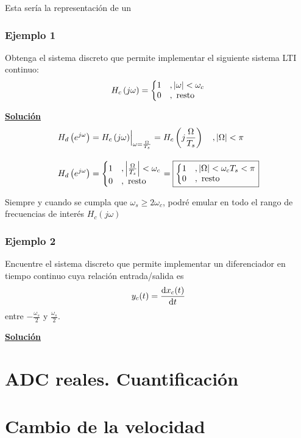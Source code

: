 \documentclass[a4paper]{book}
\begin{document}
Esta sería la representación de un

\subsubsection{Ejemplo 1}

Obtenga el sistema discreto que permite implementar el siguiente sistema LTI continuo:
\[ H_c \left( j\omega \right) = \left\lbrace
	\begin{matrix*}[l]
		1	&, \abs{\omega }<\omega _c\\
		0	&, \text{ resto}
	\end{matrix*} \right. \]

\textbf{\underline{Solución}}
\begin{align*}
	H_d \left( e^{j\omega} \right) & = \evaluat[\Big]{H_c \left( j\omega \right)}_{\omega = \frac{\Omega}{T_s}} = H_c \left( j \frac{\Omega}{T_s} \right) \quad , \abs{\Omega}<\pi \\[10pt]
	H_d \left( e^{j\omega} \right) & = \left\lbrace
	\begin{matrix*}[l]
		1 & , \abs{\frac{\Omega}{T_s} }<\omega _c\\
		0 & , \text{ resto}
	\end{matrix*} \right. = \boxed{\left\lbrace
	\begin{matrix*}[l]
		1 & , \abs{\Omega}<\omega _cT_s<\pi\\
		0 & , \text{ resto}
	\end{matrix*} \right.}
\end{align*}

Siempre y cuando se cumpla que $\omega_s\geq 2\omega_c$, podré emular en todo el rango de frecuencias de interés $H_c \left( j\omega \right)$

\subsubsection{Ejemplo 2}

Encuentre el sistema discreto que permite implementar un diferenciador en tiempo continuo cuya relación entrada/salida es
\[ y_c(t) = \dv{x_c(t)}{t} \]
entre $-\frac{\omega_s}{2}$ y $\frac{\omega_s}{2}$.

\textbf{\underline{Solución}}


\section{ADC reales. Cuantificación}

\section{Cambio de la velocidad}
\end{document}
